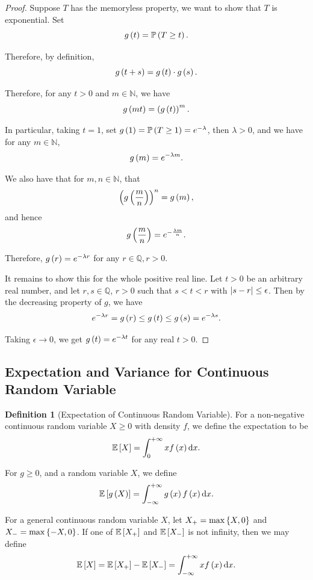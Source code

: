 \documentclass{article}
\theoremstyle{definition}
\newtheorem{definition}[theorem]{Definition}
\theoremstyle{remark}
\DeclarePairedDelimiter{\abs}{\lvert}{\rvert}
\newcommand{\QQ}{\mathbb{Q}}
\newcommand{\NN}{\mathbb{N}}
\newcommand{\Prob}{\mathbb{P}}
\newcommand{\Expt}{\mathbb{E}}
\newcommand{\plusinfty}{+\infty}
\newcommand{\minusinfty}{-\infty}
\begin{document}
\begin{proof}
    Suppose \(T\) has the memoryless property, we want to show that \(T\) is exponential. Set
    \[
        g\pqty{t} = \Prob\pqty{T \geq t}.
    \]

    Therefore, by definition,
    \[
        g\left(t + s\right) = g\left(t\right) \cdot g\left(s\right).
    \]

    Therefore, for any \(t > 0\) and \(m \in \NN\), we have
    \[
        g\left(mt\right) = \left(g\left(t\right)\right)^m.
    \]

    In particular, taking \(t = 1\), set \(g\pqty{1} = \Prob\pqty{T \geq 1} = e^{-\lambda}\), then \(\lambda > 0\), and we have for any \(m \in \NN\),
    \[
        g\left(m\right) = e^{-\lambda m}.
    \]

    We also have that for \(m, n \in \NN\), that
    \[
        \left(g\left(\frac{m}{n}\right)\right)^{n} = g\left(m\right),
    \]
    and hence
    \[
        g\left(\frac{m}{n}\right) = e^{- \frac{\lambda m}{n}}.
    \]

    Therefore, \(g\left(r\right) = e^{-\lambda r}\) for any \(r \in \QQ, r > 0\).

    It remains to show this for the whole positive real line. Let \(t > 0\) be an arbitrary real number, and let \(r, s \in \QQ\), \(r > 0\) such that \(s < t < r\) with \(\abs{s - r} \leq \epsilon\). Then by the decreasing property of \(g\), we have
    \[
        e^{-\lambda r} = g\left(r\right) \leq g\left(t\right) \leq g\left(s\right) = e^{-\lambda s}.
    \]

    Taking \(\epsilon \to 0\), we get \(g\left(t\right) = e^{-\lambda t}\) for any real \(t > 0\).
\end{proof}

\subsection{Expectation and Variance for Continuous Random Variable}

\begin{definition}[Expectation of Continuous Random Variable]
    \label{def:expectation-continuous}%
    For a non-negative continuous random variable \(X \geq 0\) with density \(f\), we define the expectation to be
    \[
        \Expt\bqty{X} = \int_{0}^{\plusinfty} x f\pqty{x} \dd{x}.
    \]

    For \(g \geq 0\), and a random variable \(X\), we define
    \[
        \Expt\bqty{g\pqty{X}} = \int_{\minusinfty}^{\plusinfty} g\pqty{x} f\pqty{x} \dd{x}.
    \]

    For a general continuous random variable \(X\), let \(X_+ = \max\left\{X, 0\right\}\) and \(X_- = \max\left\{-X, 0\right\}\). If one of \(\Expt\bqty{X_+}\) and \(\Expt\bqty{X_-}\) is not infinity, then we may define
    \[
        \Expt\bqty{X} = \Expt\bqty{X_+} - \Expt\bqty{X_-} = \int_{\minusinfty}^{\plusinfty} x f\pqty{x} \dd{x}.
    \]  
\end{definition}
\end{document}
